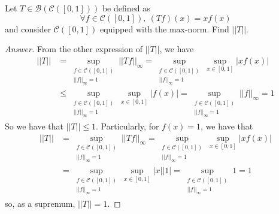 \documentclass{article}
\newcommand{\norm}[1]{\left|\left|#1\right|\right|}
\newcommand{\abs}[1]{\left|#1\right|}
\newcommand{\parens}[1]{\left(#1\right)}
\newcommand{\mC}{\mathcal{C}}
\begin{document}
    \item Let $T \in \mathcal{B}\parens{\mC\parens{[0,1]}}$ be defined as 
    $$\forall f \in \mC\parens{[0,1]},\ \parens{Tf}(x) = xf(x)$$
    and consider $\mC\parens{[0,1]}$ equipped with the max-norm. Find 
    $\norm{T}$.
    \begin{proof}[Answer]
    From the other expression of $\norm{T}$, we have 
    \begin{align*}
    \norm{T} &= \sup_{\substack{f \in \mC\parens{[0,1]} \\ 
    \norm{f}_\infty = 1}}\norm{Tf}_\infty 
    = \sup_{\substack{f \in \mC\parens{[0,1]} \\ \norm{f}_\infty = 1}}
    \sup_{x\in[0,1]}\abs{xf(x)} \\
    &\leq \sup_{\substack{f \in \mC\parens{[0,1]} \\ \norm{f}_\infty = 1}}
    \sup_{x\in[0,1]}\abs{f(x)} 
    = \sup_{\substack{f \in \mC\parens{[0,1]} \\ \norm{f}_\infty = 1}}
    \norm{f}_\infty 
    = 1
    \end{align*}
    So we have that $\norm{T} \leq 1$. Particularly, for $f(x) = 1$, 
    we have that
    \begin{align*}
    \norm{T} &= \sup_{\substack{f \in \mC\parens{[0,1]} \\ 
    \norm{f}_\infty = 1}}\norm{Tf}_\infty 
    = \sup_{\substack{f \in \mC\parens{[0,1]} \\ 
    \norm{f}_\infty = 1}}\sup_{x\in[0,1]}\abs{xf(x)} \\
    &= \sup_{\substack{f \in \mC\parens{[0,1]} \\ 
    \norm{f}_\infty = 1}}\sup_{x\in[0,1]}\abs{x}\abs{1} 
    = \sup_{\substack{f \in \mC\parens{[0,1]} \\ 
    \norm{f}_\infty = 1}} 1
    = 1
    \end{align*}
    so, as a supremum, $\norm{T} = 1$. 
    \end{proof}
\end{document}
